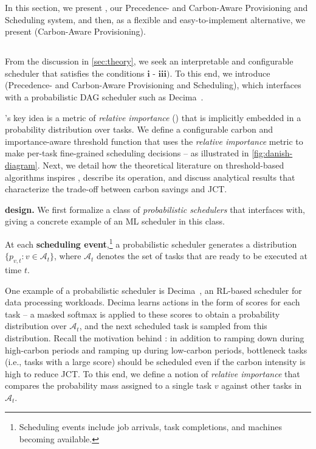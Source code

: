 

\noindent In this section, we present \PCAPS, our Precedence- and Carbon-Aware Provisioning and Scheduling system, and then, as a flexible and easy-to-implement alternative, we present \CAP (Carbon-Aware Provisioning).

\vspace{-0.5em}
\subsection{\PCAPS} \label{sec:danish-design}

From the discussion in \autoref{sec:theory}, we seek an interpretable and configurable scheduler that satisfies the conditions $\textbf{i - iii)}$.
To this end, we introduce \PCAPS (Precedence- and Carbon-Aware Provisioning and Scheduling), which interfaces with a probabilistic DAG scheduler such as Decima~\cite{Hongzi:2019:Decima}.





\PCAPS's key idea is a metric of \textit{relative importance} () that is implicitly embedded in a probability distribution over tasks.  We define a configurable carbon and importance-aware threshold function that uses the \textit{relative importance} metric to make per-task fine-grained scheduling decisions -- as illustrated in \autoref{fig:danish-diagram}. 
Next, we detail how the theoretical literature on threshold-based algorithms inspires \PCAPS, describe its operation, and discuss analytical results that characterize the trade-off between carbon savings and JCT. 

\noindent \textbf{\PCAPS design. }
We first formalize a class of \textit{probabilistic schedulers} that \PCAPS interfaces with, giving a concrete example of an ML scheduler in this class.

\vspace{-0.5em}
\begin{dfn} \label{dfn:pb}
At each \textbf{scheduling event},\footnote{Scheduling events include job arrivals, task completions, and machines becoming available.} a probabilistic scheduler generates a distribution $\{ p_{v,t} : v \in \mathcal{A}_t\}$, where $\mathcal{A}_t$ denotes the set of tasks that are ready to be executed at time $t$.
\end{dfn}
\vspace{-0.5em}

\noindent One example of a probabilistic scheduler is Decima~\cite{Hongzi:2019:Decima}, an RL-based scheduler for data processing workloads.  
Decima learns actions in the form of scores for each task -- a masked softmax is applied to these scores to obtain a probability distribution over $\mathcal{A}_t$, and the next scheduled task is sampled from this distribution.
Recall the motivation behind \PCAPS: 
in addition to ramping down during high-carbon periods and ramping up during low-carbon periods, bottleneck tasks (i.e., tasks with a large score) should be scheduled even if the carbon intensity is high to reduce JCT.
To this end, we define a notion of \textit{relative importance} that compares the probability mass assigned to a single task $v$ against other tasks in $\mathcal{A}_t$.

